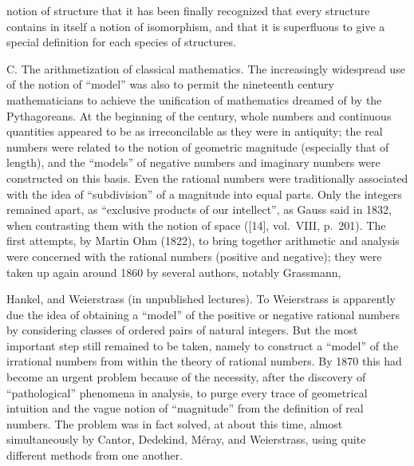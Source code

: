 notion of structure that it has been finally recognized that every structure contains in itself a notion of isomorphism, and that it is superfluous to give a special definition for each species of structures.

C. The arithmetization of classical mathematics. The increasingly widespread use of the notion of ``model'' was also to permit the nineteenth century mathematicians to achieve the unification of mathematics dreamed of by the Pythagoreans. At the beginning of the century, whole numbers and continuous quantities appeared to be as irreconcilable as they were in antiquity; the real numbers were related to the notion of geometric magnitude (especially that of length), and the ``models'' of negative numbers and imaginary numbers were constructed on this basis. Even the rational numbers were traditionally associated with the idea of ``subdivision'' of a magnitude into equal parts. Only the integers remained apart, as ``exclusive products of our intellect'', as Gauss said in 1832, when contrasting them with the notion of space ({[}14{]}, vol.~VIII, p.~201). The first attempts, by Martin Ohm (1822), to bring together arithmetic and analysis were concerned with the rational numbers (positive and negative); they were taken up again around 1860 by several authors, notably Grassmann,

Hankel, and Weierstrass (in unpublished lectures). To Weierstrass is apparently due the idea of obtaining a ``model'' of the positive or negative rational numbers by considering classes of ordered pairs of natural integers. But the most important step still remained to be taken, namely to construct a ``model'' of the irrational numbers from within the theory of rational numbers. By 1870 this had become an urgent problem because of the necessity, after the discovery of ``pathological'' phenomena in analysis, to purge every trace of geometrical intuition and the vague notion of ``magnitude'' from the definition of real numbers. The problem was in fact solved, at about this time, almost simultaneously by Cantor, Dedekind, Méray, and Weierstrass, using quite different methods from one another.

